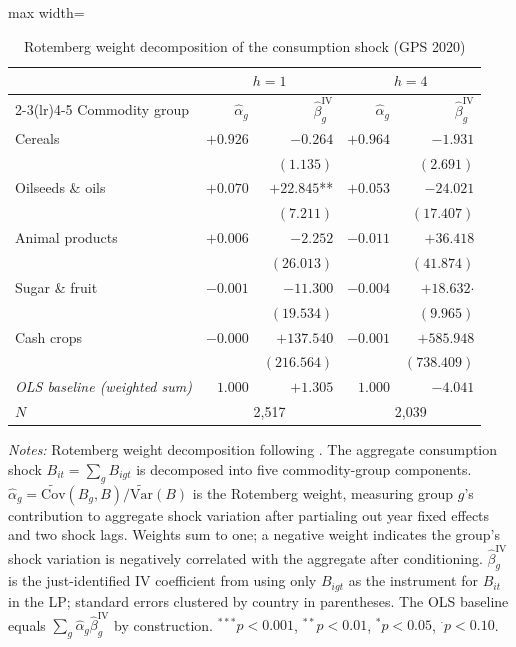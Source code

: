 
\begin{table}[htbp]
\centering
\caption{Rotemberg weight decomposition of the consumption shock (GPS 2020)}
\label{tab:rotemberg}
\begin{adjustbox}{max width=\textwidth}
\begin{threeparttable}\small
\begin{tabular}{l rr@{\quad}rr}
\toprule
 & \multicolumn{2}{c}{$h=1$} & \multicolumn{2}{c}{$h=4$} \\
\cmidrule(lr){2-3}\cmidrule(lr){4-5}
Commodity group & $\hat{\alpha}_g$ & $\hat{\beta}_g^{\text{IV}}$ & $\hat{\alpha}_g$ & $\hat{\beta}_g^{\text{IV}}$ \\
\midrule
Cereals & $+0.926$ & $-0.264$ & $+0.964$ & $-1.931$ \\
   & & $(1.135)$ & & $(2.691)$ \\[4pt]
Oilseeds \& oils & $+0.070$ & $+22.845$** & $+0.053$ & $-24.021$ \\
   & & $(7.211)$ & & $(17.407)$ \\[4pt]
Animal products & $+0.006$ & $-2.252$ & $-0.011$ & $+36.418$ \\
   & & $(26.013)$ & & $(41.874)$ \\[4pt]
Sugar \& fruit & $-0.001$ & $-11.300$ & $-0.004$ & $+18.632$$\cdot$ \\
   & & $(19.534)$ & & $(9.965)$ \\[4pt]
Cash crops & $-0.000$ & $+137.540$ & $-0.001$ & $+585.948$ \\
   & & $(216.564)$ & & $(738.409)$ \\[4pt]
\midrule
\textit{OLS baseline (weighted sum)} & $1.000$ & $+1.305$ & $1.000$ & $-4.041$ \\
\midrule
$N$ & \multicolumn{2}{c}{2,517} & \multicolumn{2}{c}{2,039} \\
\bottomrule
\end{tabular}
\begin{tablenotes}\small
\item \textit{Notes:} Rotemberg weight decomposition following \citet{GoldsmithPinkham2020}. The aggregate consumption shock $B_{it} = \sum_g B_{igt}$ is decomposed into five commodity-group components. $\hat{\alpha}_g = \widetilde{\text{Cov}}(B_g, B) / \widetilde{\text{Var}}(B)$ is the Rotemberg weight, measuring group $g$'s contribution to aggregate shock variation after partialing out year fixed effects and two shock lags. Weights sum to one; a negative weight indicates the group's shock variation is negatively correlated with the aggregate after conditioning. $\hat{\beta}_g^{\text{IV}}$ is the just-identified IV coefficient from using only $B_{igt}$ as the instrument for $B_{it}$ in the LP; standard errors clustered by country in parentheses. The OLS baseline equals $\sum_g \hat{\alpha}_g \hat{\beta}_g^{\text{IV}}$ by construction. $^{***}p<0.001$, $^{**}p<0.01$, $^{*}p<0.05$, $^{\cdot}p<0.10$.
\end{tablenotes}
\end{threeparttable}
\end{adjustbox}
\end{table}

